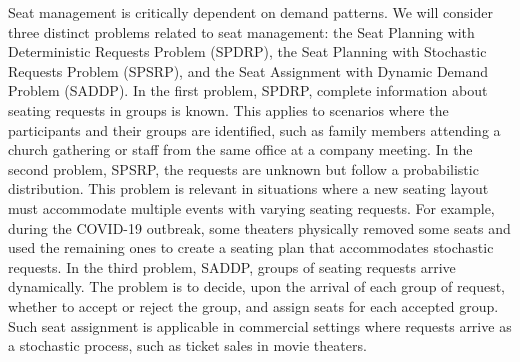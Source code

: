 Seat management is critically dependent on demand patterns. We will consider three distinct problems related to seat management: the Seat Planning with Deterministic Requests Problem (SPDRP), the Seat Planning with Stochastic Requests Problem (SPSRP), and the Seat Assignment with Dynamic Demand Problem (SADDP). In the first problem, SPDRP, complete information about seating requests in groups is known. This applies to scenarios where the participants and their groups are identified, such as family members attending a church gathering or staff from the same office at a company meeting. In the second problem, SPSRP, the requests are unknown but follow a probabilistic distribution. This problem is relevant in situations where a new seating layout must accommodate multiple events with varying seating requests. For example, during the COVID-19 outbreak, some theaters physically removed some seats and used the remaining ones to create a seating plan that accommodates stochastic requests. In the third problem, SADDP, groups of seating requests arrive dynamically. The problem is to decide, upon the arrival of each group of request, whether to accept or reject the group, and assign seats for each accepted group. Such seat assignment is applicable in commercial settings where requests arrive as a stochastic process, such as ticket sales in movie theaters.



 

